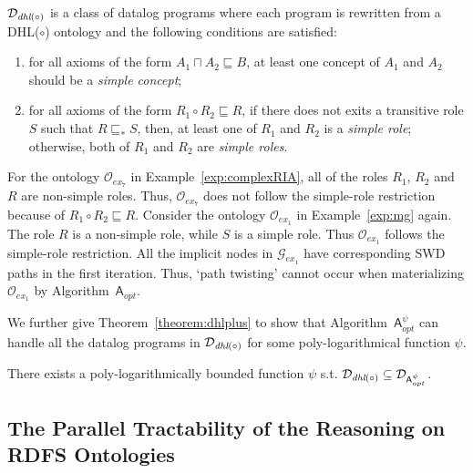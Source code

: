 \begin{definition}\label{def:dhlplus}
$\mathcal{D}_{\textit{\text{dhl}}(\circ)}$ is a class of datalog programs where each program
is rewritten from a DHL($\circ$) ontology and the following
conditions are satisfied:
\begin{enumerate}[leftmargin=4ex,label=\arabic*.]
\item for all axioms of the form $A_1\sqcap A_2\sqsubseteq B$,
    at least one concept of $A_1$ and $A_2$ should be a \emph{simple concept};
\item for all axioms of the form $R_1\circ R_2\sqsubseteq R$,
    if there does not exits a transitive role $S$ such that $R\sqsubseteq_* S$, then,
    at least one of $R_1$ and $R_2$ is a \emph{simple role}; otherwise, both of $R_1$ and $R_2$ are \emph{simple roles}.
\end{enumerate}
\end{definition}

\begin{example}
For the ontology $\mathcal{O}_{ex_7}$ in Example~\ref{exp:complexRIA}, all of the roles
$R_1$, $R_2$ and $R$ are non-simple roles. Thus, $\mathcal{O}_{ex_7}$ does not follow
the simple-role restriction because of $R_1\circ R_2\sqsubseteq R$.
Consider the ontology $\mathcal{O}_{ex_1}$
in Example~\ref{exp:mg} again. The role $R$ is a non-simple role, while $S$ is a simple role.
Thus $\mathcal{O}_{ex_1}$ follows the simple-role restriction. All the implicit nodes
in $\mathcal{G}_{ex_1}$ have corresponding SWD paths in the first iteration.
Thus, `path twisting' cannot occur when materializing $\mathcal{O}_{ex_1}$ by Algorithm~$\mathsf{A}_{opt}$.
\end{example}

We further give Theorem~\ref{theorem:dhlplus} to show that Algorithm~$\mathsf{A}_{opt}^{\psi}$ can handle
all the datalog programs in $\mathcal{D}_{\textit{\text{dhl}}(\circ)}$ for some poly-logarithmical function $\psi$.

\begin{theorem}\label{theorem:dhlplus}
There exists a poly-logarithmically bounded function $\psi$ s.t. $\mathcal{D}_{\textit{\text{dhl}}(\circ)}\subseteq\mathcal{D}_{\mathsf{A}_{opt}^{\psi}}$.
\end{theorem}

\subsection{The Parallel Tractability of the Reasoning on RDFS Ontologies}

